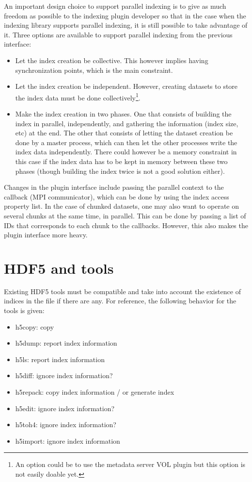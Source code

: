 An important design choice to support parallel indexing is to give as much
freedom as possible to the indexing plugin developer so that in the case when
the indexing library supports parallel indexing, it is still possible to take
advantage of it. Three options are available to support parallel indexing
from the previous interface:
\begin{itemize}
\item Let the index creation be collective. This however implies having synchronization
points, which is the main constraint.
\item Let the index creation be independent. However, creating datasets to
store the index data must be done collectively\footnote{An option could be to use
the metadata server VOL plugin but this option is not easily doable yet.}.
\item Make the index creation in two phases. One that consists of
building the index in parallel, independently, and gathering the information (index size, etc)
at the end. The other that consists of letting the dataset creation be done by a master
process, which can then let the other processes write the index data independently.
There could however be a memory constraint in this case if the index data has to
be kept in memory between these two phases (though building the index twice is not
a good solution either).
\end{itemize}

Changes in the plugin interface include passing the parallel context to the
callback (MPI communicator), which can be done by using the index access property
list.
In the case of chunked datasets, one may also want to operate on several chunks
at the same time, in parallel. This can be done by passing a list of IDs that
corresponds to each chunk to the callbacks. However, this also makes the plugin
interface more heavy.

\section{HDF5 and tools}

Existing HDF5 tools must be compatible and take into account the existence of
indices in the file if there are any. For reference, the following behavior for
the tools is given:

\begin{itemize}
\item h5copy: copy
\item h5dump: report index information
\item h5ls: report index information
\item h5diff: ignore index information?
\item h5repack: copy index information / or generate index
\item h5edit: ignore index information?
\item h5toh4: ignore index information?
\item h5import: ignore index information
\end{itemize}

